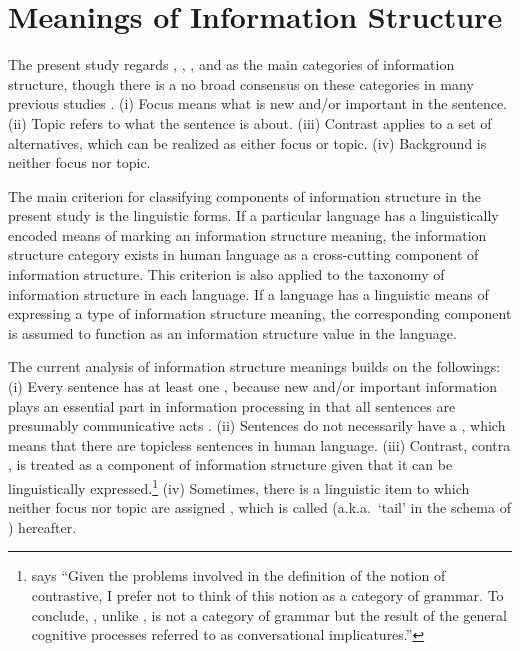 \chapter{Meanings of Information Structure}
\label{chapter3}
\setcounter{enums}{0}


The present study regards , , , and 
as the main categories of information structure, though there is a no
broad consensus on these categories in many previous studies
\citep[among others]{lambrecht:96,gundel:99,fery:krifka:08}. (i) Focus
means what is new and/or important in the sentence. (ii) Topic refers
to what the sentence is about. (iii) Contrast applies to a set of
alternatives, which can be realized as either
focus or topic.  (iv) Background is neither focus nor topic.


The main criterion for classifying components of information structure
in the present study is the linguistic forms.  If a particular
language has a linguistically encoded means of marking an information
structure meaning, the information structure category exists in human
language as a cross-cutting component of information structure.  This
criterion is also applied to the taxonomy of information structure in
each language. If a language has a linguistic means of expressing a
type of information structure meaning, the corresponding component is
assumed to function as an information structure value in the language.


The current analysis of information structure meanings builds on the
followings: (i) Every sentence has at least one , because new
and/or important information plays an essential part in information
processing in that all sentences are presumably communicative acts
\citep{engdahl:vallduvi:96,gundel:99}.  (ii) Sentences do not
necessarily have a  \citep{buring:99}, which means that there are
topicless sentences in human language.  (iii) Contrast, contra
\citet{lambrecht:96}, is treated as a component of information
structure given that it can be linguistically
expressed.\footnote{\citet[p.\ 290--291]{lambrecht:96} says ``Given
  the problems involved in the definition of the notion of
  contrastive, I prefer not to think of this notion as a category of
  grammar. To conclude, , unlike , is not a
  category of grammar but the result of the general cognitive
  processes referred to as conversational implicatures.''} (iv)
Sometimes, there is a linguistic item to which neither focus nor topic
are assigned \citep{buring:99}, which is called 
(a.k.a.\ `tail' in the schema of \citet{vallduvi:vilkuna:98})
hereafter.


